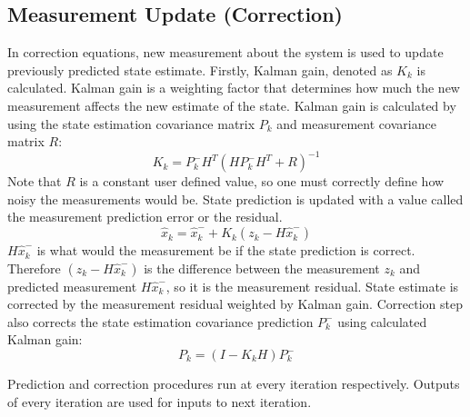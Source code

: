 \documentclass{article}
\begin{document}
\subsection*{Measurement Update (Correction)}
In correction equations, new measurement about the system is used to update previously predicted state estimate. Firstly, Kalman gain, denoted as $K_k$ is calculated. Kalman gain is a weighting factor that determines how much the new measurement affects the new estimate of the state. Kalman gain is calculated by using the state estimation covariance matrix $P_k$ and measurement covariance matrix $R$:
\begin{equation}
K_{k} = P^{-}_{k}H^{T}(HP^{-}_{k}H^{T}+R)^{-1}
\end{equation}
Note that $R$ is a constant user defined value, so one must correctly define how noisy the measurements would be. State prediction is updated with a value called the measurement prediction error or the residual.
\begin{equation}
\hat{x}_{k} = \hat{x}_{k}^{-} + K_{k}(z_{k}-H\hat{x}_{k}^{-})
\end{equation}
$H\hat{x}_{k}^{-}$ is what would the measurement be if the state prediction is correct. Therefore $(z_{k}-H\hat{x}_{k}^{-})$ is the difference between the measurement $z_k$ and predicted measurement $H\hat{x}_{k}^{-}$, so it is the measurement residual. State estimate is corrected by the measurement residual weighted by Kalman gain. Correction step also corrects the state estimation covariance prediction $P_k^{-}$ using calculated Kalman gain:
\begin{equation}
P_{k} = (I-K_{k}H)P^{-}_{k}
\end{equation}

Prediction and correction procedures run at every iteration respectively. Outputs of every iteration are used for inputs to next iteration.


\end{document}
